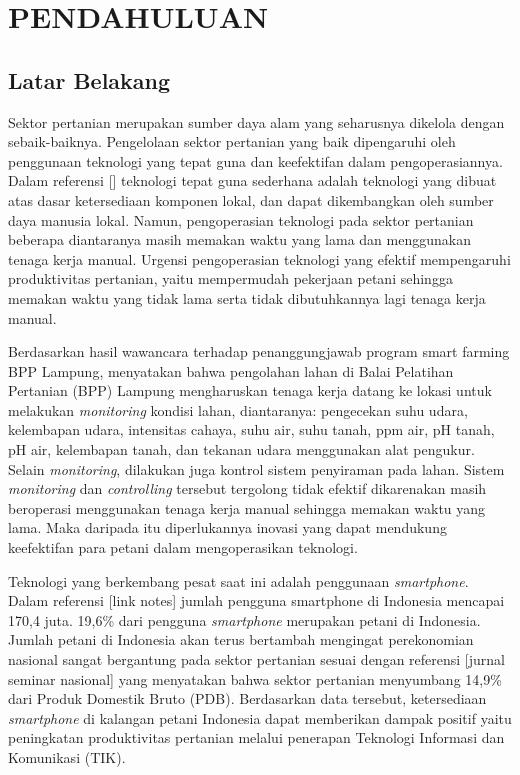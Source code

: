 \chapter{PENDAHULUAN}

\vspace{4.5pt}

\begin{flushleft}
  \begin{justify}
    \section{Latar Belakang} 
    Sektor pertanian merupakan sumber daya alam yang seharusnya dikelola dengan sebaik-baiknya. Pengelolaan sektor pertanian yang baik dipengaruhi oleh penggunaan teknologi yang tepat guna dan keefektifan dalam pengoperasiannya. Dalam referensi [] teknologi tepat guna sederhana adalah teknologi yang dibuat atas dasar ketersediaan komponen lokal, dan dapat dikembangkan oleh sumber daya manusia lokal. Namun, pengoperasian teknologi pada sektor pertanian beberapa diantaranya masih memakan waktu yang lama dan menggunakan tenaga kerja manual. Urgensi pengoperasian teknologi yang efektif mempengaruhi produktivitas pertanian, yaitu mempermudah pekerjaan petani sehingga memakan waktu yang tidak lama serta tidak dibutuhkannya lagi tenaga kerja manual. 

    Berdasarkan hasil wawancara terhadap penanggungjawab program smart farming BPP Lampung, menyatakan bahwa pengolahan lahan di Balai Pelatihan Pertanian (BPP) Lampung mengharuskan tenaga kerja datang ke lokasi untuk melakukan \textit{monitoring} kondisi lahan, diantaranya: pengecekan suhu udara, kelembapan udara, intensitas cahaya, suhu air, suhu tanah, ppm air, pH tanah, pH air, kelembapan tanah, dan tekanan udara menggunakan alat pengukur. Selain \textit{monitoring}, dilakukan juga kontrol sistem penyiraman pada lahan. Sistem \textit{monitoring} dan \textit{controlling} tersebut tergolong tidak efektif dikarenakan masih beroperasi menggunakan tenaga kerja manual sehingga memakan waktu yang lama. Maka daripada itu diperlukannya  inovasi yang dapat mendukung keefektifan para petani dalam mengoperasikan teknologi. 

    Teknologi yang berkembang pesat saat ini adalah penggunaan \textit{smartphone}. Dalam referensi [link notes] jumlah pengguna smartphone di Indonesia mencapai 170,4 juta. 19,6\% dari pengguna \textit{smartphone} merupakan petani di Indonesia. Jumlah petani di Indonesia akan terus bertambah mengingat perekonomian nasional sangat bergantung pada sektor pertanian sesuai dengan referensi [jurnal seminar nasional] yang menyatakan bahwa sektor pertanian menyumbang 14,9\% dari Produk Domestik Bruto (PDB). Berdasarkan data tersebut, ketersediaan \textit{smartphone} di kalangan petani Indonesia dapat memberikan dampak positif yaitu peningkatan produktivitas pertanian melalui penerapan Teknologi Informasi dan  Komunikasi (TIK). 


\end{justify}
\end{flushleft}
